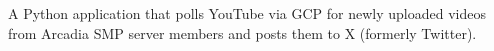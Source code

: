 

{A Python application that polls YouTube via GCP for newly uploaded videos from Arcadia SMP server members and posts them to X (formerly Twitter).}